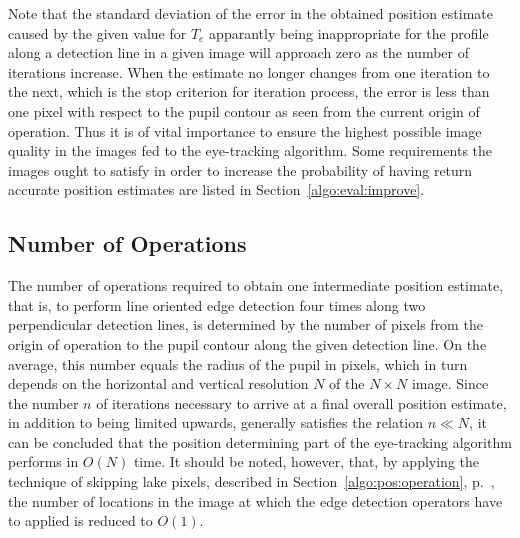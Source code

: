 Note that the standard deviation of the error in the obtained position
estimate caused by the given value for $T_{e}$ apparantly being
inappropriate for the profile along a detection line in a given image
will approach zero as the number of iterations increase.  When the
estimate no longer changes from one iteration to the next, which is
the stop criterion for iteration process, the error is less than one
pixel with respect to the pupil contour as seen from the current
origin of operation.  Thus it is of vital importance to ensure the
highest possible image quality in the images fed to the {\octopus}
eye-tracking algorithm.  Some requirements the images ought to satisfy
in order to increase the probability of having {\octopus} return
accurate position estimates are listed in
Section~\ref{algo:eval:improve}.

\subsection{Number of Operations}
\label{algo:pos:O}

The number of operations required to obtain one intermediate position
estimate, that is, to perform line oriented edge detection four times
along two perpendicular detection lines, is determined by the number
of pixels from the origin of operation to the pupil contour along the
given detection line.  On the average, this number equals the radius
of the pupil in pixels, which in turn depends on the horizontal and
vertical resolution $N$ of the $N\times N$ image.  Since the number
$n$ of iterations necessary to arrive at a final overall position
estimate, in addition to being limited upwards, generally satisfies
the relation $n\ll N$, it can be concluded that the position
determining part of the {\octopus} eye-tracking algorithm performs in
$O(N)$ time.  It should be noted, however, that, by applying the
technique of skipping lake pixels, described in
Section~\ref{algo:pos:operation}, p.~\pageref{pg:skiplakepixels}, the
number of locations in the image at which the edge detection operators
have to applied is reduced to $O(1)$.
